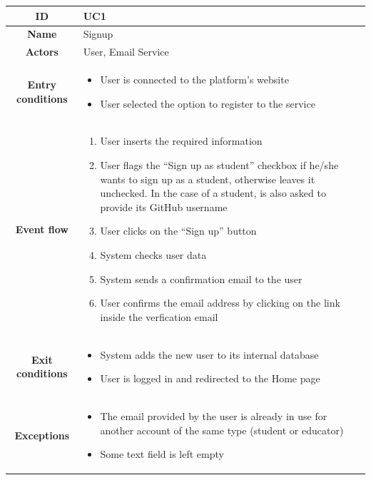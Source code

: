 \begin{center}
    \hspace{-5px}
    \begin{tabular}{ |c|m{10cm}| }
        \hline
        \textbf{ID} & UC1 \\
        \hline
        \textbf{Name} & Signup \\
        \hline
        \textbf{Actors} & User, Email Service \\
        \hline
        \textbf{Entry conditions} &
        \begin{itemize}
            \item User is connected to the platform’s website
            \item User selected the option to register to the service
        \end{itemize} \\
        \hline
        \textbf{Event flow} &
        \begin{enumerate}
            \item User inserts the required information
            \item User flags the “Sign up as student” checkbox if he/she wants to sign up as a student, otherwise leaves it unchecked. In the case of a student, is also asked to provide its GitHub username
            \item User clicks on the “Sign up” button
            \item System checks user data
            \item System sends a confirmation email to the user
            \item User confirms the email address by clicking on the link inside the verfication email
        \end{enumerate} \\
        \hline
        \textbf{Exit conditions} &
        \begin{itemize}
            \item System adds the new user to its internal database
            \item User is logged in and redirected to the Home page
        \end{itemize} \\
        \hline
        \textbf{Exceptions} & 
        \begin{itemize}
            \item The email provided by the user is already in use for another account of the same type (student or educator)
            \item Some text field is left empty

\end{itemize}
\end{tabular}
\end{center}
